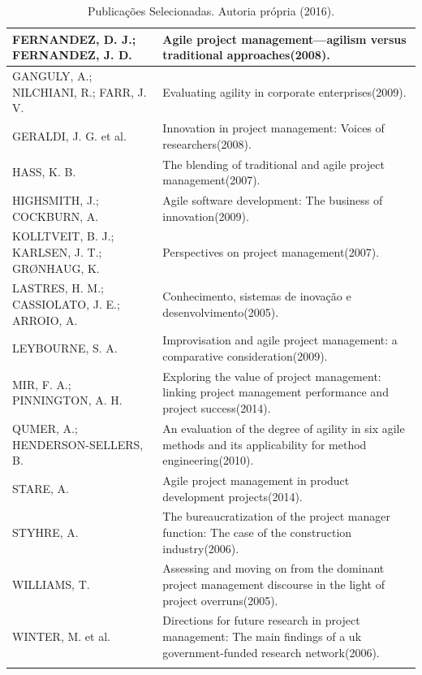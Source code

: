 \begin{longtable}{| p{} | p{} |}
  FERNANDEZ, D. J.; FERNANDEZ, J. D. & Agile project management—agilism versus traditional approaches(2008). \\ \hline
  GANGULY, A.; NILCHIANI, R.; FARR, J. V. & Evaluating agility in corporate enterprises(2009). \\ \hline
  GERALDI, J. G. et al. & Innovation in project management: Voices of researchers(2008). \\ \hline
  HASS, K. B. & The blending of traditional and agile project management(2007). \\ \hline
  HIGHSMITH, J.; COCKBURN, A. & Agile software development: The business of innovation(2009). \\ \hline
  KOLLTVEIT, B. J.; KARLSEN, J. T.; GRØNHAUG, K. & Perspectives on project management(2007). \\ \hline
  LASTRES, H. M.; CASSIOLATO, J. E.; ARROIO, A. & Conhecimento, sistemas de inovação e desenvolvimento(2005). \\ \hline
  LEYBOURNE, S. A. & Improvisation and agile project management: a comparative consideration(2009). \\ \hline
  MIR, F. A.; PINNINGTON, A. H. & Exploring the value of project management: linking project management performance and project success(2014). \\ \hline
  QUMER, A.; HENDERSON-SELLERS, B. & An evaluation of the degree of agility in six agile methods and its applicability for method engineering(2010). \\ \hline
  STARE, A. & Agile project management in product development projects(2014). \\ \hline
  STYHRE, A. & The bureaucratization of the project manager function: The case of the construction industry(2006). \\ \hline
  WILLIAMS, T. & Assessing and moving on from the dominant project management discourse in the light of project overruns(2005). \\ \hline
  WINTER, M. et al. & Directions for future research in project management: The main findings of a uk government-funded research network(2006). \\ \hline
  \caption{Publicações Selecionadas. Autoria própria (2016).}
  \label{tabela_autores}
\end{longtable}
